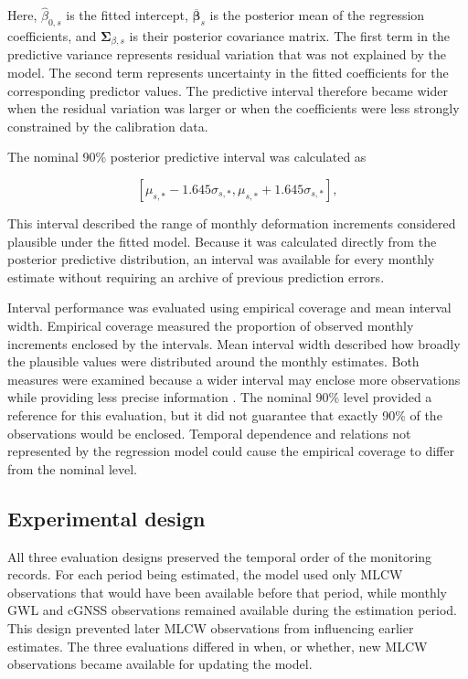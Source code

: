 Here, $\widehat{\beta}_{0,s}$ is the fitted intercept, $\overline{\boldsymbol{\beta}}_s$ is the posterior mean of the regression coefficients, and $\boldsymbol{\Sigma}_{\beta,s}$ is their posterior covariance matrix. The first term in the predictive variance represents residual variation that was not explained by the model. The second term represents uncertainty in the fitted coefficients for the corresponding predictor values. The predictive interval therefore became wider when the residual variation was larger or when the coefficients were less strongly constrained by the calibration data.

The nominal 90\% posterior predictive interval was calculated as

\begin{equation}
\left[
\mu_{s,*}-1.645\sigma_{s,*},
\mu_{s,*}+1.645\sigma_{s,*}
\right],
\label{eq:prediction_interval}
\end{equation}

This interval described the range of monthly deformation increments considered plausible under the fitted model. Because it was calculated directly from the posterior predictive distribution, an interval was available for every monthly estimate without requiring an archive of previous prediction errors.

Interval performance was evaluated using empirical coverage and mean interval width. Empirical coverage measured the proportion of observed monthly increments enclosed by the intervals. Mean interval width described how broadly the plausible values were distributed around the monthly estimates. Both measures were examined because a wider interval may enclose more observations while providing less precise information \citep{singh_uncertainty_2024}. The nominal 90\% level provided a reference for this evaluation, but it did not guarantee that exactly 90\% of the observations would be enclosed. Temporal dependence and relations not represented by the regression model could cause the empirical coverage to differ from the nominal level.

\subsection{Experimental design}
\label{subsec:experimental_design}

All three evaluation designs preserved the temporal order of the monitoring records. For each period being estimated, the model used only MLCW observations that would have been available before that period, while monthly GWL and cGNSS observations remained available during the estimation period. This design prevented later MLCW observations from influencing earlier estimates. The three evaluations differed in when, or whether, new MLCW observations became available for updating the model.

